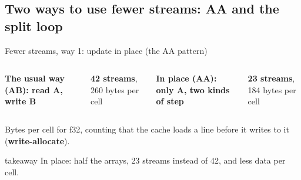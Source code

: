 \documentclass[aspectratio=169,10pt,t]{beamer}
\newcommand{\term}[1]{\textcolor{psblue!85!black}{\textbf{#1}}} %
\newcommand{\takeaway}[1]{\par\vfill
  \begin{beamercolorbox}[wd=\textwidth,sep=4pt,rounded=true]{takeaway}
    \small #1
  \end{beamercolorbox}}
\begin{document}
\subsection{Two ways to use fewer streams: AA and the split loop}
\begin{frame}{Fewer streams, way 1: update in place (the AA pattern)}
  \vspace{1mm}
  \begin{columns}[T,onlytextwidth]
    {\small\bfseries The usual way (AB): read A, write B\par}
    \vspace{3mm}
    \centering

    \vspace{1mm}
    {\small\textbf{42 streams}, 260 bytes per cell\par}
    {\small\bfseries In place (AA): only A, two kinds of step\par}
    \vspace{1mm}
    \centering

    \vspace{1mm}
    {\small\textbf{23 streams}, 184 bytes per cell\par}
  \end{columns}
  \vfill
  {\scriptsize\color{psgray}Bytes per cell for f32, counting that the cache loads a line before it writes to it
  (\term{write-allocate}).\par}
  \takeaway{In place: half the arrays, 23 streams instead of 42, and less data per cell.}
\end{frame}

\end{document}
